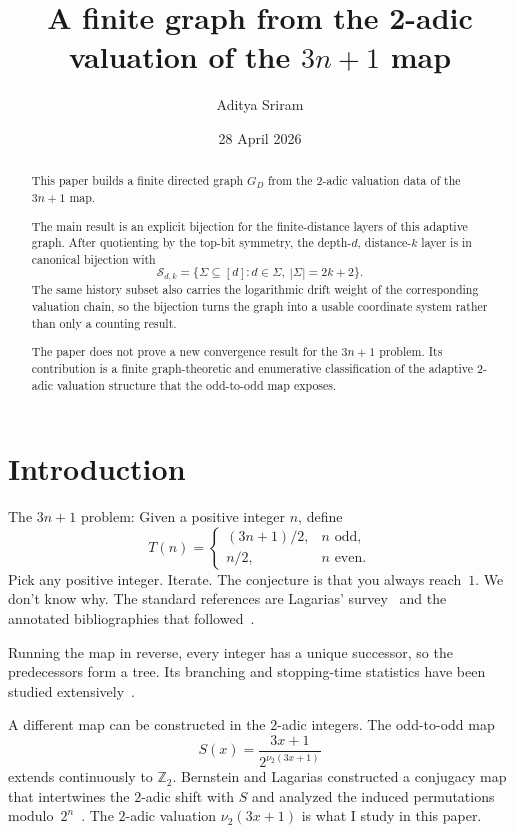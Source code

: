 \documentclass[11pt]{amsart}
\title{A finite graph from the 2-adic valuation of the \texorpdfstring{$3n+1$}{3n+1} map}
\author{Aditya Sriram}
\date{28 April 2026}
\theoremstyle{definition}
\theoremstyle{remark}
\newcommand{\Sfam}{\mathcal S}
\begin{document}
\begin{abstract}
\setlength{\parskip}{0.55em plus 0.1em minus 0.05em} 
\setlength{\parindent}{0pt} 
This paper builds a finite directed graph $G_D$ from the $2$-adic valuation
data of the $3n+1$ map.

The main result is an explicit bijection for the finite-distance layers of
this adaptive graph.  After quotienting by the top-bit symmetry, the
depth-$d$, distance-$k$ layer is in canonical bijection with
\[
\Sfam_{d,k}
=
\{\Sigma\subseteq[d]:d\in\Sigma,\ |\Sigma|=2k+2\}.
\]
The same history subset also carries the logarithmic drift weight of the
corresponding valuation chain, so the bijection turns the graph into a
usable coordinate system rather than only a counting result.

The paper does not prove a new convergence result for the $3n+1$ problem.
Its contribution is a finite graph-theoretic and enumerative classification
of the adaptive $2$-adic valuation structure that the odd-to-odd map exposes.
\end{abstract}
\maketitle

\section{Introduction}\label{sec:introduction}
The $3n+1$ problem: Given a positive integer $n$, define
\[
T(n)=
\begin{cases}
(3n+1)/2, & n\text{ odd},\\
n/2, & n\text{ even}.
\end{cases}
\]
Pick any positive integer.  Iterate.  The conjecture is that you always
reach~$1$.  We don't know why.  The standard references are Lagarias'
survey~\cite{Lagarias1985} and the annotated bibliographies that
followed~\cite{LagariasAnnotated1999, LagariasAnnotated2009, Lagarias2010}.

Running the map in reverse, every integer has a unique successor, so the predecessors form a tree.
Its branching and stopping-time statistics have been studied extensively~\cite{ApplegateLagarias1995, ApplegateLagarias2003, Wirsching1998}.

A different map can be constructed in the $2$-adic integers.  The odd-to-odd
map
\[
S(x)=\frac{3x+1}{2^{\nu_2(3x+1)}}
\]
extends continuously to $\mathbb{Z}_2$.  Bernstein and Lagarias constructed a
conjugacy map that intertwines the $2$-adic shift with $S$ and analyzed the
induced permutations modulo~$2^n$~\cite{Bernstein1994,
BernsteinLagarias1996}.  The $2$-adic valuation $\nu_2(3x+1)$ is what I study 
in this paper.
\end{document}
